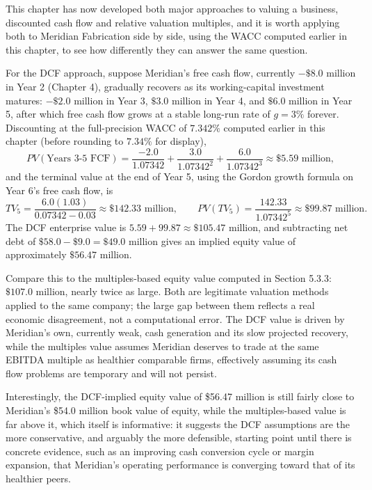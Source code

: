 \documentclass[../ai_in_finance]{subfiles}
\begin{document}
This chapter has now developed both major approaches to valuing a business, discounted cash flow and relative valuation multiples, and it is worth applying both to Meridian Fabrication side by side, using the WACC computed earlier in this chapter, to see how differently they can answer the same question.

For the DCF approach, suppose Meridian's free cash flow, currently $-\$8.0$ million in Year 2 (Chapter 4), gradually recovers as its working-capital investment matures: $-\$2.0$ million in Year 3, $\$3.0$ million in Year 4, and $\$6.0$ million in Year 5, after which free cash flow grows at a stable long-run rate of $g=3\%$ forever. Discounting at the full-precision WACC of $7.342\%$ computed earlier in this chapter (before rounding to $7.34\%$ for display),
\begin{equation*}
PV(\text{Years 3-5 FCF}) = \frac{-2.0}{1.07342} + \frac{3.0}{1.07342^2} + \frac{6.0}{1.07342^3} \approx \$5.59 \text{ million},
\end{equation*}
and the terminal value at the end of Year 5, using the Gordon growth formula on Year 6's free cash flow, is
\begin{equation*}
TV_5 = \frac{6.0(1.03)}{0.07342 - 0.03} \approx \$142.33 \text{ million}, \qquad PV(TV_5) = \frac{142.33}{1.07342^5} \approx \$99.87 \text{ million}.
\end{equation*}
The DCF enterprise value is $5.59 + 99.87 \approx \$105.47$ million, and subtracting net debt of $\$58.0 - \$9.0 = \$49.0$ million gives an implied equity value of approximately $\$56.47$ million.

Compare this to the multiples-based equity value computed in Section 5.3.3: $\$107.0$ million, nearly twice as large. Both are legitimate valuation methods applied to the same company; the large gap between them reflects a real economic disagreement, not a computational error. The DCF value is driven by Meridian's own, currently weak, cash generation and its slow projected recovery, while the multiples value assumes Meridian deserves to trade at the same EBITDA multiple as healthier comparable firms, effectively assuming its cash flow problems are temporary and will not persist.

Interestingly, the DCF-implied equity value of \$56.47 million is still fairly close to Meridian's \$54.0 million book value of equity, while the multiples-based value is far above it, which itself is informative: it suggests the DCF assumptions are the more conservative, and arguably the more defensible, starting point until there is concrete evidence, such as an improving cash conversion cycle or margin expansion, that Meridian's operating performance is converging toward that of its healthier peers.
\end{document}
